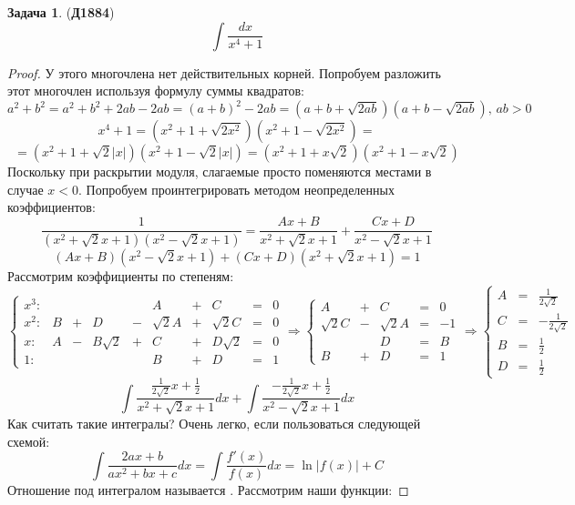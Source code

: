 \documentclass[12pt]{article}
\theoremstyle{definition}
\newtheorem{problem}{Задача}
\DeclareMathOperator{\dint}{\displaystyle\int}
\begin{document}
\begin{problem}(\textbf{Д1884})
	$$
		\dint \dfrac{dx}{x^4 + 1}
	$$
\end{problem}
\begin{proof}
	У этого многочлена нет действительных корней. Попробуем разложить этот многочлен используя формулу суммы квадратов:
	$$
		a^2 + b^2 = a^2 + b^2 +2ab - 2ab =(a + b)^2 - 2ab = (a + b + \sqrt{2ab})(a + b - \sqrt{2ab}), \, ab > 0
	$$
	$$
		x^4 + 1 = (x^2 + 1 + \sqrt{2x^2})(x^2 + 1 - \sqrt{2x^2})  = 
	$$
	$$
		= (x^2 + 1 + \sqrt{2}|x|)(x^2 + 1 - \sqrt{2}|x|) = (x^2 + 1 + x\sqrt{2})(x^2 + 1 - x\sqrt{2})
	$$
	Поскольку при раскрытии модуля, слагаемые просто поменяются местами в случае $x <0$. Попробуем проинтегрировать методом неопределенных коэффициентов:
	$$
		\dfrac{1}{(x^2 + \sqrt{2}x + 1)(x^2 - \sqrt{2}x + 1)} = \dfrac{Ax + B}{x^2 + \sqrt{2}x + 1} + \dfrac{Cx + D}{x^2 - \sqrt{2}x + 1}
	$$
	$$
		(Ax + B)(x^2 - \sqrt{2}x + 1) + (Cx + D)(x^2 + \sqrt{2}x + 1) = 1
	$$
	Рассмотрим коэффициенты по степеням:
	$$
		\left\{
			\begin{matrix}
				x^3 \colon& &&&&A &+& C &=& 0\\
				x^2 \colon& B &+& D &-& \sqrt{2}A &+& \sqrt{2}C &=& 0\\
				x \colon &A &-& B\sqrt{2} &+& C &+& D\sqrt{2} &=& 0\\
				1 \colon &  &&&&B &+& D &=& 1
			\end{matrix}
		\right. \Rightarrow
		\left\{
			\begin{matrix}
				A &+& C &=& 0 \\
				\sqrt{2}C &-& \sqrt{2}A &=& -1\\
				&&D &=& B\\
				B &+& D &=& 1 
			\end{matrix}
		\right. \Rightarrow
		\left\{
		\begin{matrix}
			A &=& \tfrac{1}{2\sqrt{2}}\\[5pt]
			C &=& -\tfrac{1}{2\sqrt{2}}\\[5pt]
			B &=& \tfrac{1}{2}\\[5pt]
			D &=& \tfrac{1}{2}
		\end{matrix}
		\right.
	$$
	$$
		\dint \dfrac{\frac{1}{2\sqrt{2}}x + \frac{1}{2}}{x^2 + \sqrt{2}x + 1}dx + \dint \dfrac{-\frac{1}{2\sqrt{2}}x + \frac{1}{2}}{ x^2 - \sqrt{2}x + 1}dx
	$$
	Как считать такие интегралы? Очень легко, если пользоваться следующей схемой:
	$$
		\dint \dfrac{2ax + b}{ax^2 + bx + c}dx = \dint \dfrac{f'(x)}{f(x)}dx = \ln{|f(x)|} + C
	$$
	Отношение под интегралом называется . Рассмотрим наши функции:

\end{proof}
\end{document}
